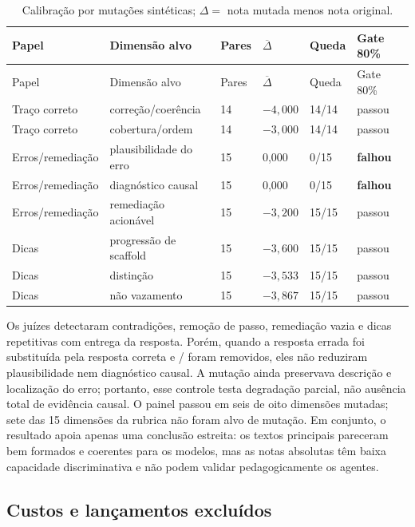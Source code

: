 \documentclass[11pt,a4paper]{article}
\begin{document}
\begingroup
\small
\setlength{\tabcolsep}{3pt}
\begin{longtable}{@{}P{2.8cm}P{4.0cm}C{1.1cm}C{1.35cm}C{1.55cm}P{2.2cm}@{}}
\caption{Calibração por mutações sintéticas; $\Delta=$ nota mutada menos nota original.}\label{tab:mutations}\\
\toprule
Papel & Dimensão alvo & Pares & $\overline{\Delta}$ & Queda & Gate 80\% \\
\midrule
\endfirsthead
\toprule
Papel & Dimensão alvo & Pares & $\overline{\Delta}$ & Queda & Gate 80\% \\
\midrule
\endhead
Traço correto & correção/coerência & 14 & $-4,000$ & 14/14 & passou \\
Traço correto & cobertura/ordem & 14 & $-3,000$ & 14/14 & passou \\
Erros/remediação & plausibilidade do erro & 15 & 0,000 & 0/15 & \textbf{falhou} \\
Erros/remediação & diagnóstico causal & 15 & 0,000 & 0/15 & \textbf{falhou} \\
Erros/remediação & remediação acionável & 15 & $-3,200$ & 15/15 & passou \\
Dicas & progressão de scaffold & 15 & $-3,600$ & 15/15 & passou \\
Dicas & distinção & 15 & $-3,533$ & 15/15 & passou \\
Dicas & não vazamento & 15 & $-3,867$ & 15/15 & passou \\
\bottomrule
\end{longtable}
\endgroup

Os juízes detectaram contradições, remoção de passo, remediação vazia e dicas repetitivas com entrega da resposta. Porém, quando a resposta errada foi substituída pela resposta correta e / foram removidos, eles não reduziram plausibilidade nem diagnóstico causal. A mutação ainda preservava descrição e localização do erro; portanto, esse controle testa degradação parcial, não ausência total de evidência causal. O painel passou em seis de oito dimensões mutadas; sete das 15 dimensões da rubrica não foram alvo de mutação. Em conjunto, o resultado apoia apenas uma conclusão estreita: os textos principais pareceram bem formados e coerentes para os modelos, mas as notas absolutas têm baixa capacidade discriminativa e não podem validar pedagogicamente os agentes.

\subsection{Custos e lançamentos excluídos}
\end{document}
